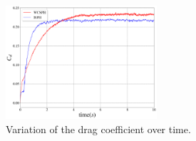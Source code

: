 \begin{figure}
	\vspace{-20pt}
	\begin{center}
		\includegraphics[width=0.5\textwidth]{images/SPH_Comparison/Figure_flow_around_cylinder.png}
	\end{center}
	\vspace{-10pt}
	\caption{Variation of the drag coefficient over time.}
	\label{fig:FoC}
\end{figure}


